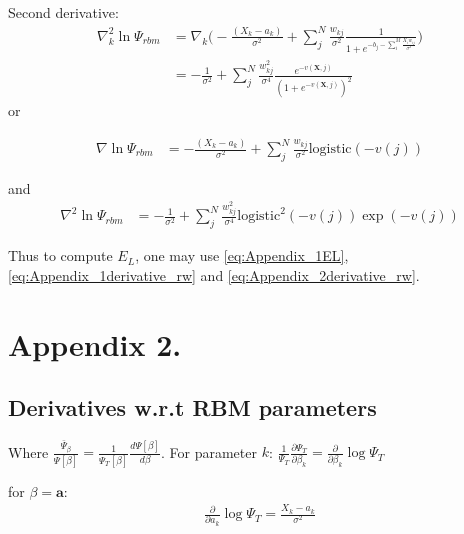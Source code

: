 \documentclass[%
oneside,                 %
final,                   %
10pt]{article}
\begin{document}
\begin{appendices}
Second derivative:
\begin{equation}
\begin{aligned}
\nabla_k^2  \ln \Psi_{rbm} &= \nabla_k  \big( 
   - \frac{(X_k - a_k)}{\sigma^2} + \sum_{j}^N \frac{w_{kj}}{\sigma^2}\frac{1}{1 + e^{-b_j  -\sum_i^M \frac{X_i w_{ij}}{\sigma^2}}}  \big) \\
  &=
 - \frac{1}{\sigma^2} + \sum_{j}^N \frac{w_{kj}^2}{\sigma^4}\frac{e^{-v(\bm X,j)}}{ ( 1 + e^{-v(\bm X,j)} )^2}  
\end{aligned}
\end{equation}
or

\begin{equation}
\begin{aligned}
\nabla \ln \Psi_{rbm}
&= - \frac{(X_k - a_k)}{\sigma^2} + \sum_{j}^N \frac{w_{kj}}{\sigma^2} \text {logistic} ( -v(j) ) 
\end{aligned}
\label{eq:Appendix_1derivative_rw}
\end{equation}

and
\begin{equation}
\begin{aligned}
\nabla^2 \ln \Psi_{rbm}
  &=
 - \frac{1}{\sigma^2} + \sum_{j}^N \frac{w_{kj}^2}{\sigma^4}  \text {logistic}^2 ( -v(j) ) \exp(-v(j))
\end{aligned}
\label{eq:Appendix_2derivative_rw}
\end{equation}

Thus to compute $E_L$, one may use \eqref{eq:Appendix_1EL}, \eqref{eq:Appendix_1derivative_rw} and \eqref{eq:Appendix_2derivative_rw}.









\section{Appendix 2.} \label{APP_2}
\subsection{Derivatives w.r.t RBM parameters}
Where $\frac{\bar \Psi_{\beta}}{\Psi [\beta]} = \frac{1}{\Psi_T [\beta]}\frac{d \Psi[\beta]}{d \beta}$. For parameter $k$: $\frac{1}{\Psi_T}\frac{\partial \Psi_T}{\partial \beta_k}=\frac{\partial}{\partial \beta_k} \log \Psi_T$

for $\beta=\bm a$:
\begin{equation}
\begin{aligned}
\frac{\partial}{\partial a_k} \log \Psi_T = \frac{X_k-a_k}{\sigma^2}
\end{aligned}
\end{equation}


\end{appendices}
\end{document}
